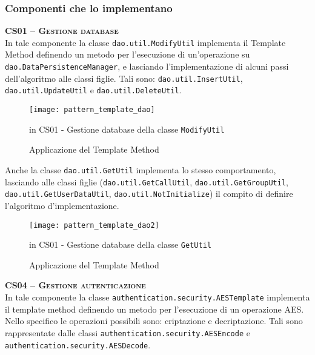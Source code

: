\subsubsection{Componenti che lo implementano}

\begin{description}

  \item{\scshape\bfseries CS01 -- Gestione database}\\
In tale componente la classe \texttt{dao.util.ModifyUtil} implementa il  Template Method definendo un metodo per l'esecuzione di un'operazione su \texttt{dao.DataPersistenceManager}, e lasciando l'implementazione di alcuni passi dell'algoritmo alle classi figlie. Tali sono: \texttt{dao.util.InsertUtil}, \texttt{dao.util.UpdateUtil} e \texttt{dao.util.DeleteUtil}.


\begin{figure}[H]
  \centering
  \texttt{[image: pattern\_template\_dao]}
  \caption{Applicazione del  Template Method}in \textsf{CS01 - Gestione database} della classe \texttt{ModifyUtil}  \label{fig:template_dao}
\end{figure}




Anche la classe \texttt{dao.util.GetUtil} implementa lo stesso comportamento, lasciando alle classi figlie (\texttt{dao.util.GetCallUtil}, \texttt{dao.util.GetGroupUtil}, \texttt{dao.util.GetUserDataUtil}, \texttt{dao.util.NotInitialize}) il compito di definire l'algoritmo d'implementazione.

\begin{figure}[H]
  \centering
  \texttt{[image: pattern\_template\_dao2]}
  \caption{Applicazione del  Template Method}in \textsf{CS01 - Gestione database} della classe \texttt{GetUtil}  \label{fig:template_dao2}
\end{figure}



	\item{\scshape\bfseries CS04 -- Gestione autenticazione}\\
In tale componente la classe \texttt{authentication.security.AESTemplate} implementa il  template method definendo un metodo per l'esecuzione di un operazione AES. Nello specifico le operazioni possibili sono: criptazione e decriptazione. Tali sono rappresentate dalle classi \texttt{authentication.security.AESEncode} e \texttt{authentication.security.AESDecode}.


\end{description}
